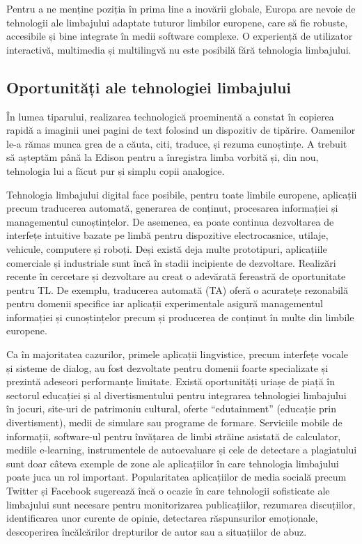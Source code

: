 \documentclass[]{../../metanetpaper}
\begin{document}
\begin{multicols}{2}

Pentru a ne menține poziția în prima line a inovării globale, Europa are nevoie de tehnologii ale limbajului adaptate tuturor limbilor europene, care să fie robuste, accesibile și bine integrate în medii software complexe. O experiență de utilizator interactivă, multimedia și multilingvă nu este posibilă fără tehnologia limbajului.

\subsection{Oportunități ale tehnologiei limbajului}

În lumea tiparului, realizarea technologică proeminentă a constat în copierea rapidă a imaginii unei pagini de text folosind un dispozitiv de tipărire. Oamenilor le-a rămas munca grea de a căuta, citi, traduce, și rezuma cunoștințe. A trebuit să așteptăm până la Edison pentru a înregistra limba vorbită și, din nou, tehnologia lui a făcut pur și simplu copii analogice.

Tehnologia limbajului digital face posibile, pentru toate limbile europene, aplicații precum traducerea automată, generarea de conținut, procesarea informației și managementul cunoștințelor. De asemenea, ea poate continua dezvoltarea de interfețe intuitive bazate pe limbă pentru dispozitive electrocasnice, utilaje, vehicule, computere și roboți. Deși există deja multe prototipuri, aplicațiile comerciale și industriale sunt încă în stadii incipiente de dezvoltare. Realizări recente în cercetare și dezvoltare au creat o adevărată fereastră de oportunitate pentru TL. De exemplu, traducerea automată (TA) oferă o acuratețe rezonabilă pentru domenii specifice iar aplicații experimentale asigură managementul informației și cunoștințelor precum și producerea de conținut în multe din limbile europene. 

Ca în majoritatea cazurilor, primele aplicații lingvistice, precum interfețe vocale și sisteme de dialog, au fost dezvoltate pentru domenii foarte specializate și prezintă adeseori performanțe limitate. Există oportunități uriașe de piață în sectorul educației și al divertismentului pentru integrarea tehnologiei limbajului în jocuri, site-uri de patrimoniu cultural, oferte “edutainment” (educație prin divertisment), medii de simulare sau programe de formare. Serviciile mobile de informații, software-ul pentru învățarea de limbi străine asistată de calculator, mediile e-learning, instrumentele de autoevaluare și cele de detectare a plagiatului sunt doar câteva exemple de zone ale aplicațiilor în care tehnologia limbajului poate juca un rol important. Popularitatea aplicațiilor de media socială precum Twitter și Facebook sugerează încă o ocazie în care tehnologii sofisticate ale limbajului sunt necesare pentru monitorizarea publicațiilor, rezumarea discuțiilor, identificarea unor curente de opinie, detectarea răspunsurilor emoționale, descoperirea încălcărilor drepturilor de autor sau a situațiilor de abuz.


\end{multicols}
\end{document}
